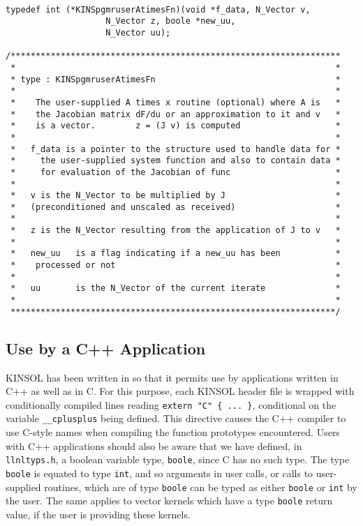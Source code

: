\documentclass[11pt]{article}
\begin{document}
\small
\begin{verbatim}

typedef int (*KINSpgmruserAtimesFn)(void *f_data, N_Vector v, 
                    N_Vector z, boole *new_uu, 
                    N_Vector uu);
  
/******************************************************************
 *                                                                *
 * type : KINSpgmruserAtimesFn                                    *
 *                                                                *
 *    The user-supplied A times x routine (optional) where A is   *
 *    the Jacobian matrix dF/du or an approximation to it and v   *
 *    is a vector.        z = (J v) is computed                   *
 *                                                                *
 *   f_data is a pointer to the structure used to handle data for *
 *     the user-supplied system function and also to contain data *
 *     for evaluation of the Jacobian of func                     *
 *                                                                *
 *   v is the N_Vector to be multiplied by J                      *
 *   (preconditioned and unscaled as received)                    *
 *                                                                *
 *   z is the N_Vector resulting from the application of J to v   *
 *                                                                * 
 *   new_uu   is a flag indicating if a new_uu has been           *
 *    processed or not                                            *
 *                                                                *
 *   uu       is the N_Vector of the current iterate              *
 *                                                                *
 *****************************************************************/

\end{verbatim}
\normalsize
 
\subsection{Use by a C++ Application}

KINSOL has been written in so that it permits use by
applications written in C++ as well as in C.  For this purpose, each
KINSOL header file is wrapped with conditionally compiled lines reading
{\tt extern "C" \{ ... \}}, conditional on the variable 
{\tt \_\_cplusplus} being defined.  This directive causes the C++
compiler to use C-style names when compiling the function prototypes
encountered.  Users with C++ applications should also be aware that we
have defined, in {\tt llnltyps.h}, a boolean variable type, 
{\tt boole}, since C has no such type.  The type {\tt boole} is
equated to type {\tt int}, and so arguments in user calls, or calls to
user-supplied routines, which are of type {\tt boole} can be typed as
either {\tt boole} or {\tt int} by the user.  The same applies to
vector kernels which have a type {\tt boole} return value, if the user
is providing these kernels.
\end{document}
